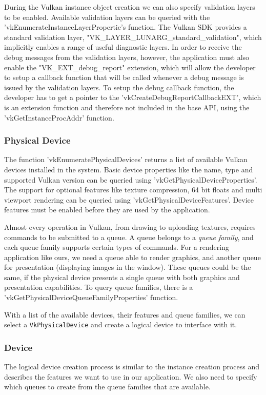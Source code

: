 During the Vulkan instance object creation we can also specify validation layers to be enabled. Available validation layers can be queried with the 'vkEnumerateInstanceLayerPropertie's function. The Vulkan SDK provides a standard validation layer, "VK\_LAYER\_LUNARG\_standard\_validation", which implicitly enables a range of useful diagnostic layers. In order to receive the debug messages from the validation layers, however, the application must also enable the "VK\_EXT\_debug\_report" extension, which will allow the developer to setup a callback function that will be called whenever a debug message is issued by the validation layers. To setup the debug callback function, the developer has to get a pointer to the 'vkCreateDebugReportCallbackEXT', which is an extension function and therefore not included in the base API, using the 'vkGetInstanceProcAddr' function.

\subsubsection{Physical Device}
The function 'vkEnumeratePhysicalDevices' returns a list of available Vulkan devices installed in the system. Basic device properties like the name, type and supported Vulkan version can be queried using 'vkGetPhysicalDeviceProperties'. The support for optional features like texture compression, 64 bit floats and multi viewport rendering can be queried using 'vkGetPhysicalDeviceFeatures'. Device features must be enabled before they are used by the application.

Almost every operation in Vulkan, from drawing to uploading textures, requires commands to be submitted to a queue. A queue belongs to a \emph{queue family}, and each queue family supports certain types of commands. For a rendering application like ours, we need a queue able to render graphics, and another queue for presentation (displaying images in the window). These queues could be the same, if the physical device presents a single queue with both graphics and presentation capabilities. To query queue families, there is a 'vkGetPhysicalDeviceQueueFamilyProperties' function.

With a list of the available devices, their features and queue families, we can select a \texttt{VkPhysicalDevice} and create a logical device to interface with it.

\subsubsection{Device}
The logical device creation process is similar to the instance creation process and describes the features we want to use in our application. We also need to specify which queues to create from the queue families that are available. 

